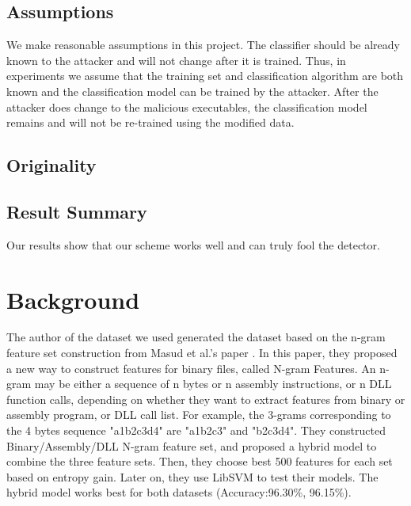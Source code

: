 \documentclass[11pt]{article}
\begin{document}
\subsection{Assumptions} \label{sec:assumption}
We make reasonable assumptions in this project. The classifier should be already known to the attacker and will not change after it is trained. Thus, in experiments we assume that the training set and classification algorithm are both known and the classification model can be trained by the attacker. After the attacker does change to the malicious executables, the classification model remains and will not be re-trained using the modified data.

\subsection{Originality}

\subsection{Result Summary}
Our results show that our scheme works well and can truly fool the detector.

\section{Background}
The author of the dataset we used generated the dataset based on the n-gram feature set construction from Masud et al.'s paper \cite{masud2007hybrid}. In this paper, they proposed a new way to construct features for binary files, called N-gram Features. An n-gram may be either a sequence of n bytes or n assembly instructions, or n DLL function calls, depending on whether they want to extract features from binary or assembly program, or DLL call list. For example, the 3-grams corresponding to the 4 bytes sequence "a1b2c3d4" are "a1b2c3" and "b2c3d4". They constructed Binary/Assembly/DLL N-gram feature set, and proposed a hybrid model to combine the three feature sets. Then, they choose best 500 features for each set based on entropy gain. Later on, they use LibSVM to test their models. The hybrid model works best for both datasets (Accuracy:96.30\%, 96.15\%).
\end{document}
